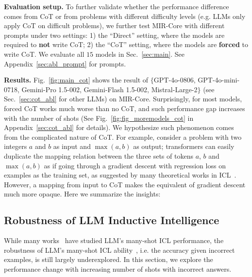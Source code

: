 \textbf{Evaluation setup.} To further validate whether the performance difference comes from  CoT or from problems with different difficulty levels (e.g. LLMs only apply CoT on difficult problems), we further test MIR-Core with different prompts under two settings: 1) the ``Direct'' setting, where the models are required to \textbf{not} write CoT; 2) the ``CoT'' setting, where the models are \textbf{forced} to write CoT. We evaluate all $15$ models in Sec.~\ref{sec:main}. See Appendix~\ref{sec:abl_prompt} for prompts.




\textbf{Results.} Fig.~\ref{fig:main_cot} shows the result of $\{$GPT-4o-0806, GPT-4o-mini-0718, Gemini-Pro 1.5-002, Gemini-Flash 1.5-002, Mistral-Large-2$\}$ (see Sec.~\ref{sec:cot_abl} for other LLMs) on MIR-Core. Surprisingly, for most models, forced CoT works much worse than no CoT, and such performance gap increases with the number of shots (See Fig.~\ref{fig:fig_moremodels_cot} in Appendix~\ref{sec:cot_abl} for details). We hypothesize such phenomenon comes from the complicated nature of CoT. For example, consider a problem with two integers $a$ and $b$ as input and $\max(a,b)$ as output; transformers can easily duplicate the mapping relation between the three sets of tokens $a$, $b$ and $\max(a,b)$ as if going through a gradient descent with regression loss on examples as the training set, as suggested by many theoretical works in ICL~\citep{dai2022can, von2023transformers, mahankali2023one}. However, a mapping from input to CoT makes the equivalent of gradient descent much more opaque. Here we summarize the insights:






\subsection{Robustness of LLM Inductive Intelligence}

While many works~\citep{agarwal2024many} have studied LLM's many-shot ICL performance, the robustness of LLM's many-shot ICL ability~\citep{zhao2024context}, i.e. the accuracy given incorrect examples, is still largely underexplored. In this section, we explore the performance change with increasing number of shots with incorrect answers.

